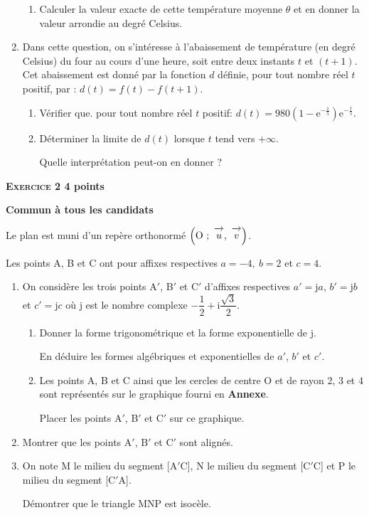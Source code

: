 \documentclass[10pt]{article}
\newcommand{\vect}[1]{\overrightarrow{\,\mathstrut#1\,}}
\def\Ouv{$\left(\text{O}~;~\vect{u},~\vect{v}\right)$}
\begin{document}
\begin{enumerate}
\begin{enumerate}
		\item  Calculer la valeur exacte de cette température moyenne $\theta$ et en donner la valeur
arrondie au degré Celsius.
	\end{enumerate}
\item  Dans cette question, on s'intéresse à l'abaissement de température (en degré Celsius) du
four au cours d'une heure, soit entre deux instants $t$ et $(t + 1)$. Cet abaissement est donné
par la fonction $d$ définie, pour tout nombre réel $t$ positif, par : $d(t) = f(t) - f(t + 1)$.
	\begin{enumerate}
		\item Vérifier que. pour tout nombre réel $t$ positif: $d(t) = 980\left(1 - \text{e}^{- \frac{1}{5}}\right)\text{e}^{- \frac{t}{5}}$.
		\item Déterminer la limite de $d(t)$ lorsque $t$ tend vers $+ \infty$.
		
Quelle interprétation peut-on en donner ?
 	\end{enumerate}
\end{enumerate}

\newpage

\textbf{\textsc{Exercice 2} \hfill 4 points}
 
\textbf{Commun  à tous les candidats}

\medskip

Le plan est muni d'un repère orthonormé \Ouv.

\smallskip

Les points A, B et C ont pour affixes respectives $a = - 4,\: b = 2$ et $c = 4$.

\medskip

\begin{enumerate}
\item On considère les trois points A$'$, B$'$ et C$'$ d'affixes respectives $a'= \text{j}a$, $b'= \text{j}b$ et $c'= \text{j}c$ où j est le nombre complexe $-\dfrac{1}{2} + \text{i}\dfrac{\sqrt{3}}{2}$.

	\begin{enumerate}
		\item Donner la forme trigonométrique et la forme exponentielle de j.
		
En déduire les formes algébriques et exponentielles de $a'$, $b'$ et $c'$.
		\item Les points A, B et C ainsi que les cercles de centre O et de rayon 2, 3 et 4 sont
représentés sur le graphique fourni en \textbf{Annexe}.
		
Placer les points A$'$, B$'$ et C$'$ sur ce graphique.
	\end{enumerate}
\item  Montrer que les points A$'$, B$'$ et C$'$ sont alignés.
\item  On note M le milieu du segment [A$'$C], N le milieu du segment [C$'$C] et P le milieu du
segment [C$'$A]. 
	
Démontrer que le triangle MNP est isocèle.
\end{enumerate}
\end{document}
